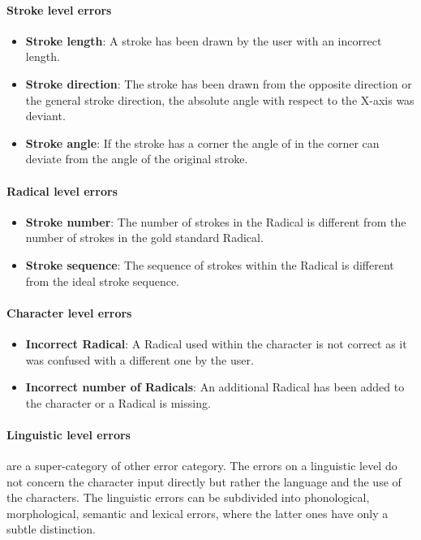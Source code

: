 \paragraph{Stroke level errors} 
\begin{itemize}
\item \textbf{Stroke length}: A stroke has been drawn by the user with an 
      incorrect length.
\item \textbf{Stroke direction}: The stroke has been drawn from the opposite
      direction or the general stroke direction, the absolute angle with respect 
      to the X-axis was deviant.
\item \textbf{Stroke angle}: If the stroke has a corner the angle of in the
      corner can deviate from the angle of the original stroke.
\end{itemize}

\paragraph{Radical level errors}
\begin{itemize}
\item \textbf{Stroke number}: The number of strokes in the Radical is different
      from the number of strokes in the gold standard Radical.
\item \textbf{Stroke sequence}: The sequence of strokes within the Radical
      is different from the ideal stroke sequence.
\end{itemize}

\paragraph{Character level errors}
\begin{itemize}
\item \textbf{Incorrect Radical}: A Radical used within the character is not
      correct as it was confused with a different one by the user.
\item \textbf{Incorrect number of Radicals}: An additional Radical has been 
      added to the character or a Radical is missing.
\end{itemize}

\paragraph{Linguistic level errors} are a super-category of other error category.
The errors on a linguistic level do not concern the character input directly
but rather the language and the use of the characters. The linguistic errors
can be subdivided into phonological, morphological, semantic and lexical errors,
where the latter ones have only a subtle distinction.

